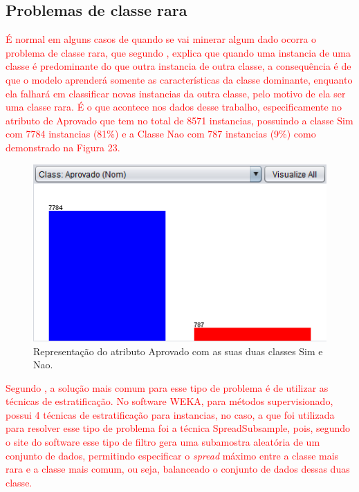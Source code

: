 \subsection{Problemas de classe rara}

\par
\textcolor{red}{É normal em alguns casos de quando se vai minerar algum dado ocorra o problema de classe rara, que segundo , explica que quando uma instancia de uma classe é predominante do que outra instancia de outra classe, a consequência é de que o modelo aprenderá somente as características da classe dominante, enquanto ela falhará em classificar novas instancias da outra classe, pelo motivo de ela ser uma classe rara. É o que acontece nos dados desse trabalho, especificamente no atributo de Aprovado que tem no total de 8571 instancias, possuindo a classe Sim com 7784 instancias (81\%) e a Classe Nao com 787 instancias (9\%) como demonstrado na Figura 23.}

\par
\begin{figure}[!htp]
	\begin{center}
    \caption{\label{fig:waveform_fig} Representação do atributo Aprovado com as suas duas classes Sim e Nao.}
	\includegraphics[scale=0.90]{Figuras/Atributo_aprovado.png}
	\end{center}
\end{figure}

\par
\textcolor{red}{Segundo , a solução mais comum para esse tipo de problema é de utilizar as técnicas de estratificação. No software WEKA, para métodos supervisionado, possui 4 técnicas de estratificação para instancias, no caso, a que foi utilizada para resolver esse tipo de problema foi a técnica SpreadSubsample, pois, segundo o site do software  esse tipo de filtro gera uma subamostra aleatória de um conjunto de dados, permitindo especificar o \textit{spread} máximo entre a classe mais rara e a classe mais comum, ou seja, balanceado o conjunto de dados dessas duas classe.}

